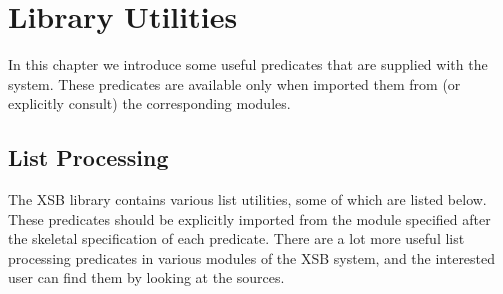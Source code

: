 \chapter{Library Utilities} \label{library_utilities}

In this chapter we introduce some useful predicates that are supplied
with the system. These predicates are available only when imported
them from (or explicitly consult) the corresponding modules.


\section{List Processing}
The XSB library contains various list utilities, some of which 
are listed below.  These predicates should be explicitly imported from
the module specified after the skeletal specification of each predicate.
There are a lot more useful list processing predicates in various modules
of the XSB system, and the interested user can find them by 
looking at the sources.

